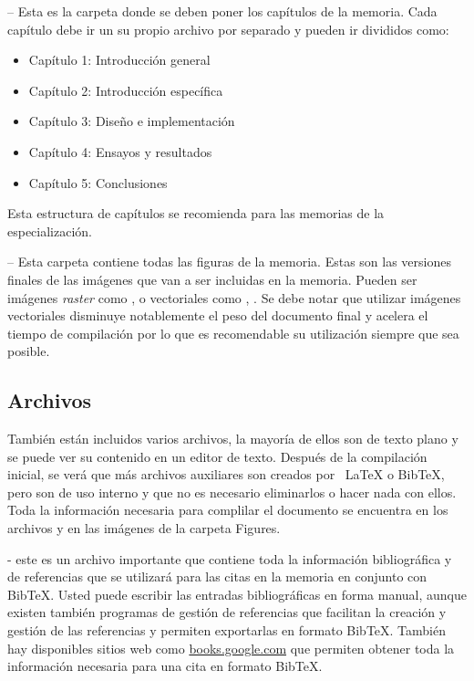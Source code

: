  -- Esta es la carpeta donde se deben poner los capítulos de la memoria. Cada capítulo debe ir un su propio archivo  por separado y pueden ir divididos como:
\begin{itemize}
\item Capítulo 1: Introducción general	
\item Capítulo 2: Introducción específica
\item Capítulo 3: Diseño e implementación
\item Capítulo 4: Ensayos y resultados
\item Capítulo 5: Conclusiones

\end{itemize}

Esta estructura de capítulos se recomienda para las memorias de la especialización.

 -- Esta carpeta contiene todas las figuras de la memoria.  Estas son las versiones finales de las imágenes que van a ser incluidas en la memoria.  Pueden ser imágenes \textit{raster} como ,  o vectoriales como , .  Se debe notar que utilizar imágenes vectoriales disminuye notablemente el peso del documento final y acelera el tiempo de compilación por lo que es recomendable su utilización siempre que sea posible.

\subsection{Archivos}

También están incluidos varios archivos, la mayoría de ellos son de texto plano y se puede ver su contenido en un editor de texto. Después de la compilación inicial, se verá que más archivos auxiliares son creados por \ LaTeX{} o BibTeX, pero son de uso interno y que no es necesario eliminarlos o hacer nada con ellos.  Toda la información necesaria para complilar el documento se encuentra en los archivos  y en las imágenes de la carpeta Figures.

 - este es un archivo importante que contiene toda la información bibliográfica y de referencias que se utilizará para las citas en la memoria en conjunto con BibTeX. Usted puede escribir las entradas bibliográficas en forma manual, aunque existen también programas de gestión de referencias que facilitan la creación y gestión de las referencias y permiten exportarlas en formato BibTeX.  También hay disponibles sitios web como \url{books.google.com} que permiten obtener toda la información necesaria para una cita en formato BibTeX.

